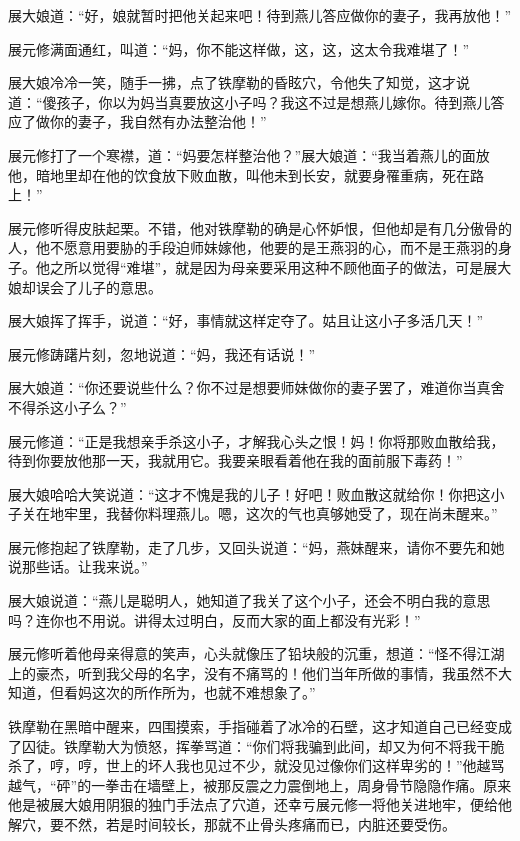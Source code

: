 \documentclass[12pt,oneside]{book}
\begin{document}
展大娘道：``好，娘就暂时把他关起来吧！待到燕儿答应做你的妻子，我再放他！''

展元修满面通红，叫道：``妈，你不能这样做，这，这，这太令我难堪了！''

展大娘冷冷一笑，随手一拂，点了铁摩勒的昏眩穴，令他失了知觉，这才说道：``傻孩子，你以为妈当真要放这小子吗？我这不过是想燕儿嫁你。待到燕儿答应了做你的妻子，我自然有办法整治他！''

展元修打了一个寒襟，道：``妈要怎样整治他？''展大娘道：``我当着燕儿的面放他，暗地里却在他的饮食放下败血散，叫他未到长安，就要身罹重病，死在路上！''

展元修听得皮肤起栗。不错，他对铁摩勒的确是心怀妒恨，但他却是有几分傲骨的人，他不愿意用要胁的手段迫师妹嫁他，他要的是王燕羽的心，而不是王燕羽的身子。他之所以觉得``难堪''，就是因为母亲要采用这种不顾他面子的做法，可是展大娘却误会了儿子的意思。

展大娘挥了挥手，说道：``好，事情就这样定夺了。姑且让这小子多活几天！''

展元修踌躇片刻，忽地说道：``妈，我还有话说！''

展大娘道：``你还要说些什么？你不过是想要师妹做你的妻子罢了，难道你当真舍不得杀这小子么？''

展元修道：``正是我想亲手杀这小子，才解我心头之恨！妈！你将那败血散给我，待到你要放他那一天，我就用它。我要亲眼看着他在我的面前服下毒药！''

展大娘哈哈大笑说道：``这才不愧是我的儿子！好吧！败血散这就给你！你把这小子关在地牢里，我替你料理燕儿。嗯，这次的气也真够她受了，现在尚未醒来。''

展元修抱起了铁摩勒，走了几步，又回头说道：``妈，燕妹醒来，请你不要先和她说那些话。让我来说。''

展大娘说道：``燕儿是聪明人，她知道了我关了这个小子，还会不明白我的意思吗？连你也不用说。讲得太过明白，反而大家的面上都没有光彩！''

展元修听着他母亲得意的笑声，心头就像压了铅块般的沉重，想道：``怪不得江湖上的豪杰，听到我父母的名字，没有不痛骂的！他们当年所做的事情，我虽然不大知道，但看妈这次的所作所为，也就不难想象了。''

铁摩勒在黑暗中醒来，四围摸索，手指碰着了冰冷的石壁，这才知道自己已经变成了囚徒。铁摩勒大为愤怒，挥拳骂道：``你们将我骗到此间，却又为何不将我干脆杀了，哼，哼，世上的坏人我也见过不少，就没见过像你们这样卑劣的！''他越骂越气，``砰''的一拳击在墙壁上，被那反震之力震倒地上，周身骨节隐隐作痛。原来他是被展大娘用阴狠的独门手法点了穴道，还幸亏展元修一将他关进地牢，便给他解穴，要不然，若是时间较长，那就不止骨头疼痛而已，内脏还要受伤。
\end{document}
